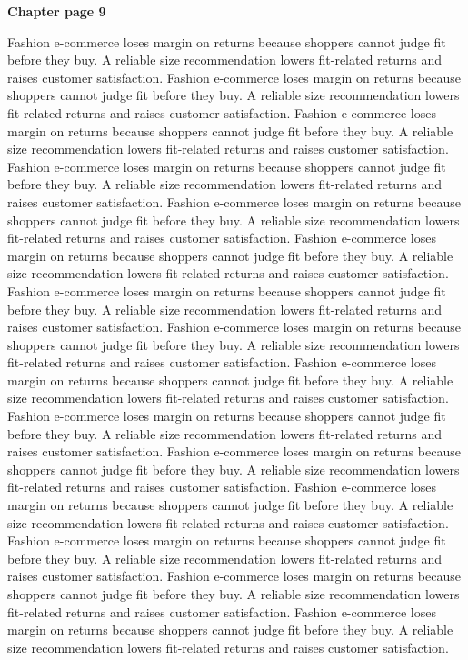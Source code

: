 \documentclass[a4paper,11pt]{article}
\begin{document}
{\headfont\bfseries\Large Chapter page 9}\par\medskip
Fashion e-commerce loses margin on returns because shoppers cannot judge fit before they buy. A reliable size recommendation lowers fit-related returns and raises customer satisfaction. Fashion e-commerce loses margin on returns because shoppers cannot judge fit before they buy. A reliable size recommendation lowers fit-related returns and raises customer satisfaction. Fashion e-commerce loses margin on returns because shoppers cannot judge fit before they buy. A reliable size recommendation lowers fit-related returns and raises customer satisfaction. Fashion e-commerce loses margin on returns because shoppers cannot judge fit before they buy. A reliable size recommendation lowers fit-related returns and raises customer satisfaction. Fashion e-commerce loses margin on returns because shoppers cannot judge fit before they buy. A reliable size recommendation lowers fit-related returns and raises customer satisfaction. 
Fashion e-commerce loses margin on returns because shoppers cannot judge fit before they buy. A reliable size recommendation lowers fit-related returns and raises customer satisfaction. Fashion e-commerce loses margin on returns because shoppers cannot judge fit before they buy. A reliable size recommendation lowers fit-related returns and raises customer satisfaction. Fashion e-commerce loses margin on returns because shoppers cannot judge fit before they buy. A reliable size recommendation lowers fit-related returns and raises customer satisfaction. Fashion e-commerce loses margin on returns because shoppers cannot judge fit before they buy. A reliable size recommendation lowers fit-related returns and raises customer satisfaction. Fashion e-commerce loses margin on returns because shoppers cannot judge fit before they buy. A reliable size recommendation lowers fit-related returns and raises customer satisfaction. 
Fashion e-commerce loses margin on returns because shoppers cannot judge fit before they buy. A reliable size recommendation lowers fit-related returns and raises customer satisfaction. Fashion e-commerce loses margin on returns because shoppers cannot judge fit before they buy. A reliable size recommendation lowers fit-related returns and raises customer satisfaction. Fashion e-commerce loses margin on returns because shoppers cannot judge fit before they buy. A reliable size recommendation lowers fit-related returns and raises customer satisfaction. Fashion e-commerce loses margin on returns because shoppers cannot judge fit before they buy. A reliable size recommendation lowers fit-related returns and raises customer satisfaction. Fashion e-commerce loses margin on returns because shoppers cannot judge fit before they buy. A reliable size recommendation lowers fit-related returns and raises customer satisfaction. \newpage
\end{document}
